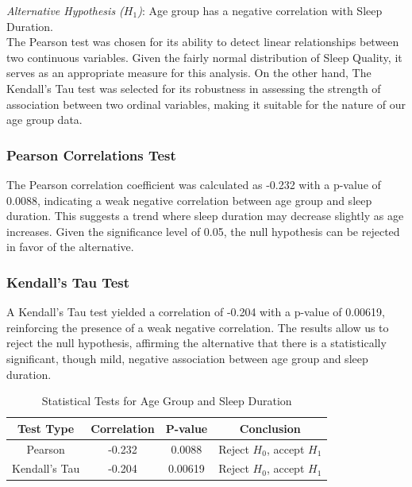 \documentclass[conference]{IEEEtran}
\begin{document}
\textit{Alternative Hypothesis (\(H_1\))}: Age group has a negative correlation with Sleep Duration.\\
The Pearson test was chosen for its ability to detect linear relationships between two continuous variables. Given the fairly normal distribution of Sleep Quality, it serves as an appropriate measure for this analysis. On the other hand, The Kendall’s Tau test was selected for its robustness in assessing the strength of association between two ordinal variables, making it suitable for the nature of our age group data.


\subsubsection*{Pearson Correlations Test}
The Pearson correlation coefficient was calculated as -0.232 with a p-value of 0.0088, indicating a weak negative correlation between age group and sleep duration. This suggests a trend where sleep duration may decrease slightly as age increases. Given the significance level of 0.05, the null hypothesis can be rejected in favor of the alternative.

\subsubsection*{Kendall’s Tau Test}
A Kendall’s Tau test yielded a correlation of -0.204 with a p-value of 0.00619, reinforcing the presence of a weak negative correlation. The results allow us to reject the null hypothesis, affirming the alternative that there is a statistically significant, though mild, negative association between age group and sleep duration.

\begin{table}[ht]
    \centering
    \caption{Statistical Tests for Age Group and Sleep Duration}
    \label{tab:hypothesis2}
    \begin{tabular}{|c|c|c|c|}
        \hline
        \textbf{Test Type} & \textbf{Correlation} & \textbf{P-value} & \textbf{Conclusion}            \\
        \hline
        Pearson            & -0.232               & 0.0088           & Reject \(H_0\), accept \(H_1\) \\
        \hline
        Kendall’s Tau      & -0.204               & 0.00619          & Reject \(H_0\), accept \(H_1\) \\
        \hline
    \end{tabular}
\end{table}
\end{document}
